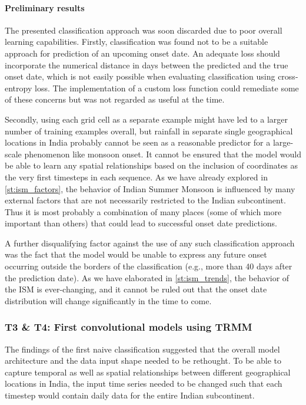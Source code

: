 \paragraph{Preliminary results}
\label{ssst:nn_t2_results}
The presented classification approach was soon discarded due to poor overall learning capabilities. Firstly, classification was found not to be a suitable approach for prediction of an upcoming onset date. An adequate loss should incorporate the numerical distance in days between the predicted and the true onset date, which is not easily possible when evaluating classification using cross-entropy loss. The implementation of a custom loss function could remediate some of these concerns but was not regarded as useful at the time.

Secondly, using each grid cell as a separate example might have led to a larger number of training examples overall, but rainfall in separate single geographical locations in India probably cannot be seen as a reasonable predictor for a large-scale phenomenon like monsoon onset. It cannot be ensured that the model would be able to learn any spatial relationships based on the inclusion of coordinates as the very first timesteps in each sequence. As we have already explored in \cref{st:ism_factors}, the behavior of Indian Summer Monsoon is influenced by many external factors that are not necessarily restricted to the Indian subcontinent. Thus it is most probably a combination of many places (some of which more important than others) that could lead to successful onset date predictions.

A further disqualifying factor against the use of any such classification approach was the fact that the model would be unable to express any future onset occurring outside the borders of the classification (e.g., more than 40 days after the prediction date). As we have elaborated in \cref{st:ism_trends}, the behavior of the ISM is ever-changing, and it cannot be ruled out that the onset date distribution will change significantly in the time to come.

\subsubsection{T3 \& T4: First convolutional models using TRMM}
\label{sst:nn_t3}
The findings of the first naive classification suggested that the overall model architecture and the data input shape needed to be rethought. To be able to capture temporal as well as spatial relationships between different geographical locations in India, the input time series needed to be changed such that each timestep would contain daily data for the entire Indian subcontinent.

